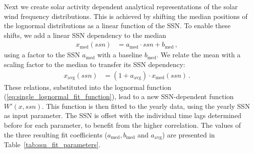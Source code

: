 \documentclass[]{aa}
\begin{document}
	Next we create solar activity dependent analytical representations of the solar wind frequency distributions. This is achieved by shifting the median positions of the lognormal distributions as a linear function of the SSN. To enable these shifts, we add a linear SSN dependency to the median
	\begin{align}
		x_\text{med}(ssn) &= a_\text{med} \cdot ssn + b_\text{med}\,,	\label{eq:median_with_ssn}
	\end{align}
	using a factor to the SSN $a_\text{med}$ with a baseline $b_\text{med}$. We relate the mean with a scaling factor to the median to transfer its SSN dependency:
	\begin{align}
		x_\text{avg}(ssn) &= \left(1 + a_\text{avg}\right) \cdot x_\text{med}(ssn)\,.	\label{eq:mean_with_ssn}
	\end{align}
	These relations, substituted into the lognormal function (\ref{eq:single_lognormal_fit_function}), lead to a new SSN-dependent function $W'(x,ssn)$. This function is then fitted to the yearly data, using the yearly SSN as input parameter. The SSN is offset with the individual time lags determined before for each parameter, to benefit from the higher correlation. The values of the three resulting fit coefficients ($a_\text{med}, b_\text{med}$ and $a_\text{avg}$) are presented in Table~\ref{tab:ssn_fit_parameters}.
\end{document}
